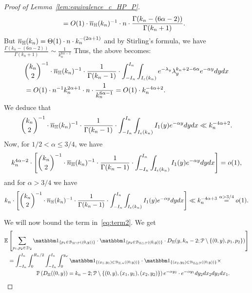 \begin{proof}[Proof of Lemma~\ref{lem:equivalence_c_HP_P}]
\begin{equation*}
\begin{split}
&=O(1) \cdot \overline{n}_{\mathbb{H}}(k_n)^{-1} \cdot n \cdot  
 \frac{ \Gamma (k_n-(6\alpha-2))}{\Gamma (k_n+1)}.
\end{split}
\end{equation*}
But $\overline{n}_{\mathbb{H}}(k_n) = \Theta (1) \cdot n \cdot k_n^{-(2\alpha +1)}$ and by Stirling's formula, we have 
$\frac{ \Gamma (k_n-(6\alpha-2))}{\Gamma (k_n+1)} \sim \frac{1}{k_n^{6\alpha-1}}$ 
Thus, the above becomes: 
\begin{equation*} 
\begin{split}
&{k_n \choose 2}^{-1} \cdot \overline{n}_{\mathbb{H}}(k_n)^{-1} \cdot 
\frac{1}{\Gamma (k_n-1)} \cdot \int_{-I_n}^{I_n} \int_{I_{\varepsilon} (k_n)} e^{-\lambda_y} \lambda_y^{k_n+2-6\alpha} e^{-\alpha y} dy dx  \\ 
&=O(1) \cdot n^{-1} k_n^{2\alpha +1} \cdot n \cdot \frac{1}{k_n^{6\alpha-1}} = O(1) \cdot  k_n^{-4\alpha +2}.
\end{split}
\end{equation*}
We deduce that 
\begin{equation*}
\begin{split}
{k_n \choose 2}^{-1} \cdot \overline{n}_{\mathbb{H}}(k_n)^{-1} \cdot 
\frac{1}{\Gamma (k_n-1)} \cdot \int_{-I_n}^{I_n} \int_{I_{\varepsilon} (k_n)}  I_1 (y) e^{-\alpha y} dy dx \ll k_n^{-4\alpha+2}.
\end{split}
\end{equation*}
Now, for $1/2 < \alpha \leq 3/4$, we have
$$k_n^{4\alpha -2} \cdot \left[{k_n \choose 2}^{-1} \cdot \overline{n}_{\mathbb{H}}(k_n)^{-1} \cdot 
\frac{1}{\Gamma (k_n-1)} \cdot \int_{-I_n}^{I_n} \int_{I_{\varepsilon} (k_n)}  I_1 (y) e^{-\alpha y} dy dx \right] =o(1),$$
and for $\alpha >3/4$ we have 
$$k_n \cdot \left[{k_n \choose 2}^{-1} \cdot \overline{n}_{\mathbb{H}}(k_n)^{-1} \cdot 
\frac{1}{\Gamma (k_n-1)} \cdot \int_{-I_n}^{I_n} \int_{I_{\varepsilon} (k_n)}  I_1 (y) e^{-\alpha y} dy dx \right] \ll 
k_n^{-4\alpha + 3} \stackrel{\alpha >3/4}{=}o(1).$$

We will now bound the term in~\eqref{eq:term2}. 
We get
\begin{equation} \label{eq:1sum-expansion}
\begin{split} 
{\mathbb E}& \left[  \sum_{p_1, p_2\in \dom{2}} \ind{p_1 \in \BallInter{(0,y)}} \cdot \ind{p_2 \in \BallSym{(0,y)}} \cdot 
D_\H (y,k_n-2;\Pcal \setminus \{ (0,y),p_1,p_2\})  \right] \\
&=\int_{-I_n}^{I_n} \int_0^{R_n/2}\int_{-I_n}^{I_n} \int_0^{y_\omega}
 \ind{(x_1,y_1) \in \BallHyp{(0,y)}} \cdot 
 \ind{(x_2,y_2) \in \BallSym{(0,y)}}\times \\
& \hspace{1.8cm} \Prob{D_\H ((0,y))=k_n-2;\Pcal \setminus \{ (0,y),(x_1,y_1), (x_2,y_2)\}}
  e^{-\alpha y_2} \cdot e^{-\alpha y_1} dy_2 dx_2dy_1 dx_1.
\end{split}
\end{equation}


\end{proof}

